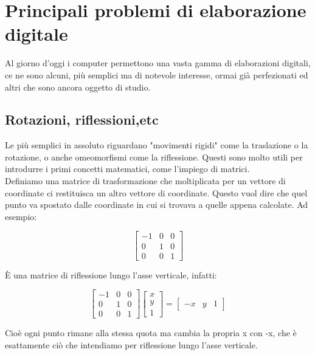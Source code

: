 \chapter{Principali problemi di elaborazione digitale}


Al giorno d'oggi i computer permettono una vasta gamma di elaborazioni digitali, ce ne sono alcuni, più semplici ma di notevole interesse, ormai già perfezionati ed altri che sono ancora oggetto di studio.

\section{Rotazioni, riflessioni,etc}
Le più semplici in assoluto riguardano "movimenti rigidi" come la traslazione o la rotazione, o anche omeomorfismi come la riflessione. Questi sono molto utili per introdurre i primi concetti matematici, come l'impiego di matrici.\\
Definiamo una matrice di trasformazione che moltiplicata per un vettore di coordinate ci restituisca un altro vettore di coordinate. Questo vuol dire che quel punto va spostato dalle coordinate in cui si trovava a quelle appena calcolate. Ad esempio:

$$
{\begin{bmatrix}
-1&0&0\\
0&1&0\\
0&0&1
\end{bmatrix}}
$$

\noindent
\`E una matrice di riflessione lungo l'asse verticale, infatti: 

$$
{\begin{bmatrix}
-1&0&0\\
0&1&0\\
0&0&1
\end{bmatrix}}
\begin{bmatrix}
x\\y\\1
\end{bmatrix}
=
\begin{bmatrix}
-x&y&1
\end{bmatrix}
$$	

\vspace{1em} \noindent
Cioè ogni punto rimane alla stessa quota ma cambia la propria x con -x, che è esattamente ciò che intendiamo per riflessione lungo l'asse verticale.

